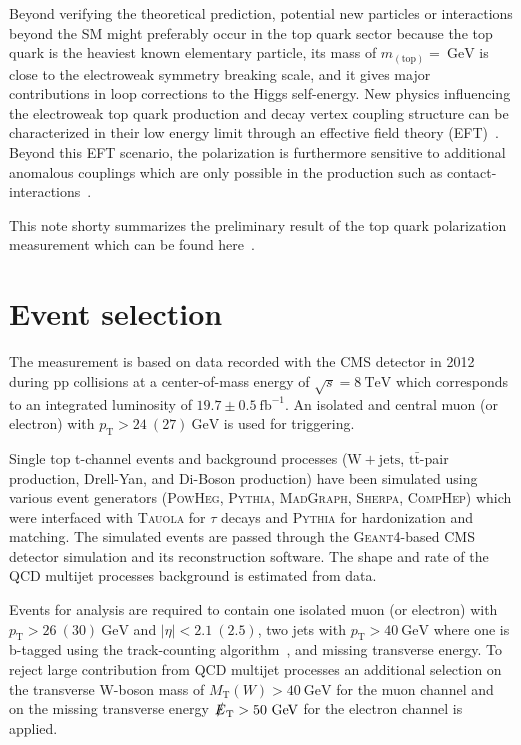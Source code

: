 \documentclass[a4paper]{jpconf}
\newcommand{\unit}[1]{\ensuremath{\mathrm{~#1}}}
\newcommand{\wjets}[0]{\mathrm{W+jets}}
\newcommand{\ttbar}[0]{\ensuremath{\mathrm{t\bar{t}}}}
\newcommand{\pT}[0]{\ensuremath{p_\mathrm{T}}}
\newcommand{\mtw}[0]{\ensuremath{M_\mathrm{T}(W)}}
\newcommand{\met}[0]{\ensuremath{\slashed E_\mathrm{T}}}
\newcommand{\fixme}[1]{\textsc{\color{red}{\bf #1}}}
\begin{document}
Beyond verifying the theoretical prediction, potential new particles or interactions beyond the SM might preferably occur in the top quark sector because the top quark is the heaviest known elementary particle, its mass of $m_{\mathrm{(top)}}=$\fixme{???}$\unit{GeV}$ is close to the electroweak symmetry breaking scale, and it gives major contributions in loop corrections to the Higgs self-energy. New physics influencing the electroweak top quark production and decay vertex coupling structure can be characterized in their low energy limit through an effective field theory (EFT)~\cite{jaaswpol}. Beyond this EFT scenario, the polarization is furthermore sensitive to additional anomalous couplings which are only possible in the production such as contact-interactions~\cite{fabian}.


This note shorty summarizes the preliminary result of the top quark polarization measurement which can be found here~\cite{stpol}.


\section{Event selection}
The measurement is based on data recorded with the CMS detector in 2012 during pp collisions at a center-of-mass energy of $\sqrt{s}=8\unit{TeV}$ which corresponds to an integrated luminosity of $19.7\pm0.5\unit{fb^{-1}}$. An isolated and central muon (or electron) with $\pT>24~(27)\unit{GeV}$ is used for triggering.


Single top t-channel events and background processes ($\wjets$, $\ttbar$-pair production, Drell-Yan, and Di-Boson production) have been simulated using various event generators (\textsc{PowHeg}, \textsc{Pythia}, \textsc{MadGraph}, \textsc{Sherpa}, \textsc{CompHep}) which were interfaced with \textsc{Tauola} for $\tau$ decays and \textsc{Pythia} for hardonization and matching. The simulated events are passed through the \textsc{Geant4}-based CMS detector simulation and its reconstruction software. The shape and rate of the QCD multijet processes background is estimated from data.


Events for analysis are required to contain one isolated muon (or electron) with $\pT>26~(30)\unit{GeV}$ and $|\eta|<2.1~(2.5)$, two jets with $\pT>40\unit{GeV}$ where one is b-tagged using the track-counting algorithm~\cite{tc}, and missing transverse energy. To reject large contribution from QCD multijet processes an additional selection on the transverse W-boson mass of $\mtw>40\unit{GeV}$ for the muon channel and on the missing transverse energy $\met>50\unit{GeV}$ for the electron channel is applied. 
\end{document}
